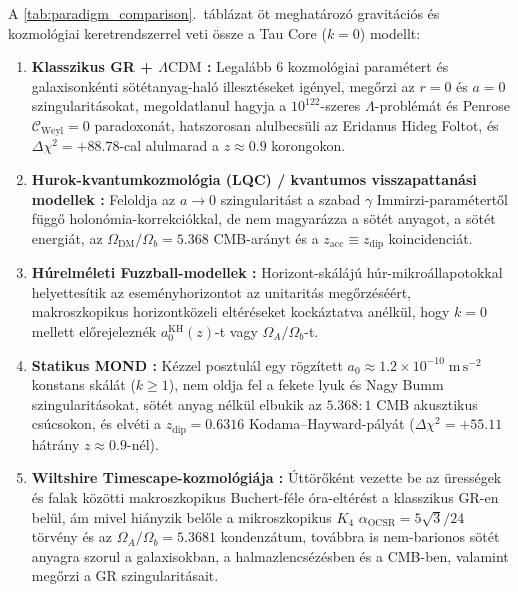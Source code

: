 \documentclass[11pt,a4paper]{article}
\theoremstyle{remark}
\begin{document}
A \ref{tab:paradigm_comparison}.\ t\'abl\'azat \"ot meghat\'aroz\'o gravit\'aci\'os \'es kozmol\'ogiai keretrendszerrel veti \"ossze a Tau Core ($k = 0$) modellt:
\begin{enumerate}
  \item \textbf{Klasszikus GR + $\Lambda\mathrm{CDM}$ \cite{HawkingEllis1973,Planck2018VI}:} Legal\'abb $6$ kozmol\'ogiai param\'etert \'es galaxisonk\'enti s\"ot\'etanyag-hal\'o illeszt\'eseket ig\'enyel, meg\H{o}rzi az $r = 0$ \'es $a = 0$ szingularit\'asokat, megoldatlanul hagyja a $10^{122}$-szeres $\Lambda$-probl\'em\'at \'es Penrose $\mathcal{C}_{\mathrm{Weyl}} = 0$ paradoxon\'at, hatszorosan alulbecs\"uli az Eridanus Hideg Foltot, \'es $\Delta\chi^2 = +88.78$-cal alulmarad a $z \approx 0.9$ korongokon.
  \item \textbf{Hurok-kvantumkozmol\'ogia (LQC) / kvantumos visszapattan\'asi modellek \cite{Ashtekar2006LQC}:} Feloldja az $a \to 0$ szingularit\'ast a szabad $\gamma$ Immirzi-param\'etert\H{o}l f\"ugg\H{o} holon\'omia-korrekci\'okkal, de nem magyar\'azza a s\"ot\'et anyagot, a s\"ot\'et energi\'at, az $\Omega_{\mathrm{DM}}/\Omega_b = 5.368$ CMB-ar\'anyt \'es a $z_{\mathrm{acc}} \equiv z_{\mathrm{dip}}$ koincidenci\'at.
  \item \textbf{H\'urelm\'eleti Fuzzball-modellek \cite{Mathur2005Fuzzball}:} Horizont-sk\'al\'aj\'u h\'ur-mikro\'allapotokkal helyettes\'itik az esem\'enyhorizontot az unitarit\'as meg\H{o}rz\'es\'e\'ert, makroszkopikus horizontk\"ozeli elt\'er\'eseket kock\'aztatva an\'elk\"ul, hogy $k = 0$ mellett el\H{o}rejelezn\'ek $a_0^{\mathrm{KH}}(z)$-t vagy $\Omega_A/\Omega_b$-t.
  \item \textbf{Statikus MOND \cite{Milgrom1983}:} K\'ezzel posztul\'al egy r\"ogz\'itett $a_0 \approx 1.2 \times 10^{-10}\;\mathrm{m\,s^{-2}}$ konstans sk\'al\'at ($k \ge 1$), nem oldja fel a fekete lyuk \'es Nagy Bumm szingularit\'asokat, s\"ot\'et anyag n\'elk\"ul elbukik az $5.368:1$ CMB akusztikus cs\'ucsokon, \'es elv\'eti a $z_{\mathrm{dip}} = 0.6316$ Kodama--Hayward-p\'aly\'at ($\Delta\chi^2 = +55.11$ h\'atr\'any $z \approx 0.9$-n\'el).
  \item \textbf{Wiltshire Timescape-kozmol\'ogi\'aja \cite{Wiltshire2007Timescape}:} \'Utt\"or\H{o}k\'ent vezette be az \"uress\'egek \'es falak k\"oz\"otti makroszkopikus Buchert-f\'ele \'ora-elt\'er\'est a klasszikus GR-en bel\"ul, \'am mivel hi\'anyzik bel\H{o}le a mikroszkopikus $K_4$ $\alpha_{\mathrm{OCSR}} = 5\sqrt{3}/24$ t\"orv\'eny \'es az $\Omega_A/\Omega_b = 5.3681$ kondenz\'atum, tov\'abbra is nem-barionos s\"ot\'et anyagra szorul a galaxisokban, a halmazlencs\'ez\'esben \'es a CMB-ben, valamint meg\H{o}rzi a GR szingularit\'asait.
\end{enumerate}
\end{document}
